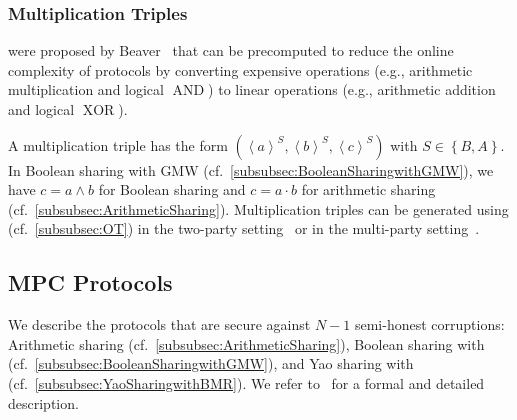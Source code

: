 \subsubsection{Multiplication Triples}
\label{subsubsec:MTs}
\mts were proposed by Beaver~\cite{beaver1991efficient} that can be precomputed to reduce the online complexity of \smpc protocols by converting expensive operations (e.g., arithmetic multiplication and logical $\operatorname{AND}$) to linear operations (e.g., arithmetic addition and logical $\operatorname{XOR}$).

A multiplication triple has the form $\left(\left\langle a\right\rangle^S , \left\langle b\right\rangle^S,\left\langle c\right\rangle^S\right) $ with $S\in \left\{B,A\right\} $.
In Boolean sharing with GMW (cf.~\autoref{subsubsec:BooleanSharingwithGMW}), we have $c=a\land b$ for Boolean sharing and $c=a \cdot  b$ for arithmetic sharing (cf.~\autoref{subsubsec:ArithmeticSharing}).
Multiplication triples can be generated using \correlatedot (cf.~\autoref{subsubsec:OT}) in the two-party setting~\cite{demmler2015aby} or in the multi-party setting~\cite{braun2022motion}.



\subsection{MPC Protocols}
\label{subsec:MPCProtocols}
We describe the \smpc protocols that are secure against $N-1$ semi-honest corruptions: Arithmetic sharing (cf.~\autoref{subsubsec:ArithmeticSharing}), Boolean sharing with \gmw (cf.~\autoref{subsubsec:BooleanSharingwithGMW}), and Yao sharing with \bmr (cf.~\autoref{subsubsec:YaoSharingwithBMR}).
We refer to~\cite{demmler2015aby, braun2022motion} for a formal and detailed description.

